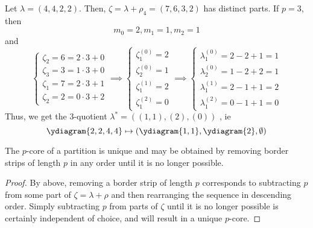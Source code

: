 \documentclass[11pt,leqno,oneside]{amsart}
\numberwithin{thm}{section}
\begin{document}
\begin{example}
  Let \(\lambda=(4,4,2,2)\). Then, \(\zeta = \lambda+\rho_4 =
  (7,6,3,2)\) has distinct parts. If \(p=3\), then \[
    m_0 = 2, m_1 = 1, m_2 = 1
  \]
  and \[
    \begin{cases}
      \zeta_2 = 6 = 2 \cdot 3 + 0\\
      \zeta_3 = 3 = 1 \cdot 3 + 0\\
      \zeta_1 = 7 = 2 \cdot 3 + 1 \\
      \zeta_2 = 2 = 0 \cdot 3 + 2
    \end{cases} \implies
    \begin{cases}
      \zeta^{(0)}_1 = 2\\
      \zeta^{(0)}_2 = 1\\
      \zeta^{(1)}_1 = 2\\
      \zeta^{(2)}_1 = 0
    \end{cases}
    \implies
    \begin{cases}
      \lambda_1^{(0)} = 2-2+1 = 1\\
      \lambda_2^{(0)} = 1-2+2 = 1\\
      \lambda_1^{(1)} = 2-1+1 = 2\\
      \lambda_1^{(2)} = 0-1+1 = 0
    \end{cases}
  \]
  Thus, we get the \(3\)-quotient \(\lambda^* = ((1,1),(2),(0))\)   
,
  ie \[
    \ydiagram{2,2,4,4} \mapsto \left( \ydiagram{1,1},\ydiagram{2},
      \emptyset \right)
  \]
\end{example}
\begin{prop}
  The \(p\)-core of a partition is unique and may be obtained by
  removing border strips of length \(p\) in any order until it is no longer
  possible. 
\end{prop}
\begin{proof}
  By above, removing a border strip of length \(p\) corresponds to
  subtracting \(p\) from some part of \(\zeta = \lambda+\rho\) and
  then rearranging the sequence in descending order. Simply
  subtracting \(p\) from parts of \(\zeta\) until it is no longer
  possible is certainly independent of choice, and will result in a
  unique \(p\)-core.
\end{proof}
\end{document}
